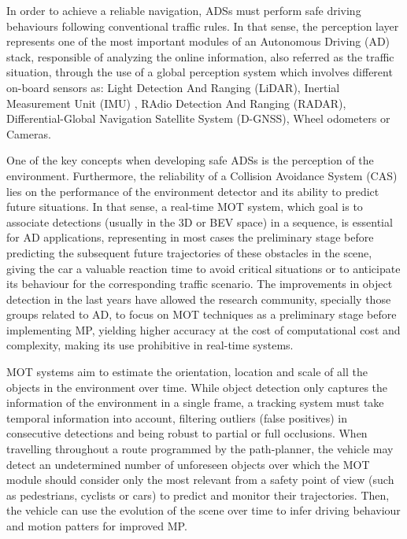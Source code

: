In order to achieve a reliable navigation, \acp{ADS} must perform safe driving behaviours following conventional traffic rules. In that sense, the perception layer represents one of the most important modules of an Autonomous Driving (AD) stack, responsible of analyzing the online information, also referred as the traffic situation, through the use of a global perception system \cite{gomez2019simulating} which involves different on-board sensors as: Light Detection And Ranging (LiDAR), Inertial Measurement Unit (IMU) , RAdio Detection And Ranging (RADAR), Differential-Global Navigation Satellite System (D-GNSS), Wheel odometers or Cameras.

One of the key concepts when developing safe \acp{ADS} is the perception of the environment. Furthermore, the reliability of a Collision Avoidance System (CAS) lies on the performance of the environment detector and its ability to predict future situations. In that sense, a real-time \ac{MOT} system, which goal is to associate detections (usually in the 3D or \ac{BEV} space) in a sequence, is essential for \ac{AD} applications, representing in most cases the preliminary stage before predicting the subsequent future trajectories of these obstacles in the scene, giving the car a valuable reaction time to avoid critical situations or to anticipate its behaviour for the corresponding traffic scenario. The improvements in object detection in the last years have allowed the research community, specially those groups related to \ac{AD}, to focus on \ac{MOT} techniques as a preliminary stage before implementing \ac{MP}, yielding higher accuracy at the cost of computational cost and complexity, making its use prohibitive in real-time systems. 

\ac{MOT} systems aim to estimate the orientation, location and scale of all the objects in the environment over time. While object detection only captures the information of the environment in a single frame, a tracking system must take temporal information into account, filtering outliers (\aka false positives) in consecutive detections and being robust to partial or full occlusions. When travelling throughout a route programmed by the path-planner, the vehicle may detect an undetermined number of unforeseen objects over which the \ac{MOT} module should consider only the most relevant from a safety point of view (such as pedestrians, cyclists or cars) to predict and monitor their trajectories. Then, the vehicle can use the evolution of the scene over time to infer driving behaviour and motion patters for improved \ac{MP}.

